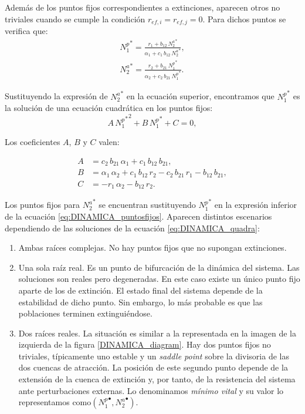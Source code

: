 Además de los puntos fijos correspondientes a extinciones, aparecen otros no triviales cuando se cumple la condición $r_{ef,i} = r_{ef,j} = 0$. Para dichos puntos se verifica que: 
\begin{align}
{N^p_{1}}^* = \frac{ r_{1}+ b_{12} \, {N^a_{2}}^* }{\alpha_{1}+ c_{1}\, b_{12}\, {N^a_{2}}^* } , \nonumber\\ 
{N^a_{2}}^* = \frac{ r_{2}+ b_{21}\, {N^p_{1}}^* }{\alpha_{2}+ c_{2} \, b_{21}\, {N^p_{1}}^* } .
\label{eq:DINAMICA_puntosfijos}
\end{align}

Sustituyendo la expresión de ${N^{a}_2}^*$ en la ecuación superior, encontramos que ${N^p_1}^*$ es la solución de una ecuación cuadrática en los puntos fijos: 
\begin{equation}
A\, {{N^p_1}^*}^2 + B \, {N^p_1}^* + C=0 ,
\label{eq:DINAMICA_quadra}
\end{equation}

Los coeficientes $A$, $B$ y $C$ valen:

\begin{align}
\displaystyle A &= c_{2}\, b_{21}\, \alpha_{1}+c_{1}\, b_{12}\, b_{21} , \nonumber \\
\displaystyle B &= \alpha_{1}\, \alpha_{2}+ c_{1}\, b_{12}\, r_{2} - c_{2}\, b_{21}\, r_{1} - b_{12}\, b_{21} ,\nonumber\\
\displaystyle C &= - r _{1}\, \alpha_{2} - b_{12}\, r_{2} .
\label{eq:DINAMICA_puntos_n1}
\end{align}

Los puntos fijos para ${N^a_2}^*$ se encuentran sustituyendo ${N^p_1}^*$ en la expresión inferior de la ecuación \ref{eq:DINAMICA_puntosfijos}. Aparecen distintos escenarios dependiendo de las soluciones de la ecuación \ref{eq:DINAMICA_quadra}:

\begin{enumerate}
\item Ambas raíces complejas. No hay puntos fijos que no supongan extinciones.
\item Una sola raíz real. Es un punto de bifurcación de la dinámica del sistema. Las soluciones son reales pero degeneradas. En este caso existe un único punto fijo aparte de los de extinción. El estado final del sistema depende de la estabilidad de dicho punto. Sin embargo, lo más probable es que las poblaciones terminen extinguiéndose.
\item Dos raíces reales. La situación es similar a la representada en la imagen de la izquierda de la figura \ref{DINAMICA_diagram}. Hay dos puntos fijos no triviales, típicamente uno estable y un \textit{saddle point} sobre la divisoria de las dos cuencas de atracción. La posición de este segundo punto depende de la extensión de la cuenca de extinción y, por tanto, de la resistencia del sistema ante perturbaciones externas. Lo denominamos \textit{mínimo vital} y su valor lo representamos como$({N_{1}^{p}}^\bullet,{N_{2}^{a}}^\bullet)$.
\end{enumerate}

